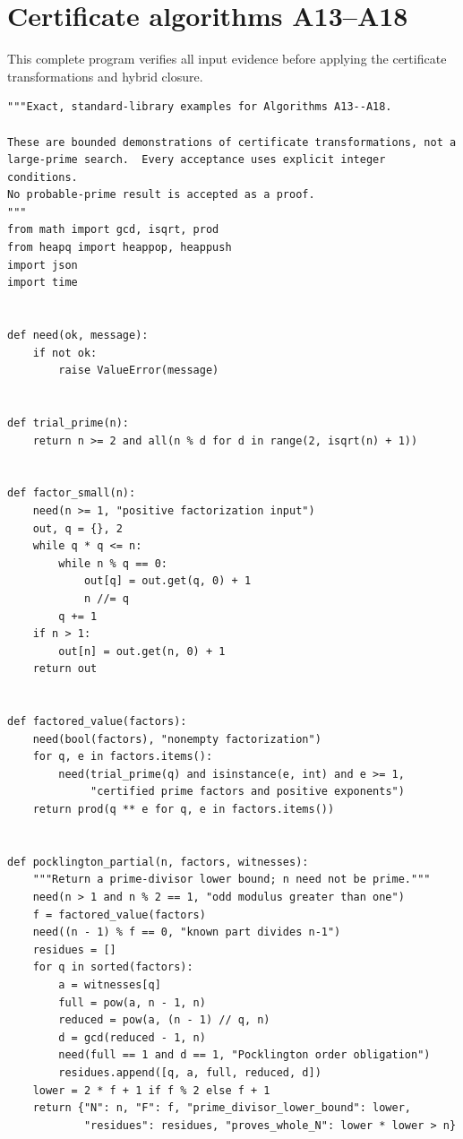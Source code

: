\documentclass[11pt,a4paper]{article}
\theoremstyle{definition}\newtheorem{definition}[theorem]{Definition}
\theoremstyle{remark}\newtheorem{remark}[theorem]{Remark}
\begin{document}
\section{Certificate algorithms A13--A18}
\label{app:certificates}

This complete program verifies all input evidence before applying the certificate transformations and hybrid closure.

\begin{lstlisting}[label=lst:certificates]
"""Exact, standard-library examples for Algorithms A13--A18.

These are bounded demonstrations of certificate transformations, not a
large-prime search.  Every acceptance uses explicit integer conditions.
No probable-prime result is accepted as a proof.
"""
from math import gcd, isqrt, prod
from heapq import heappop, heappush
import json
import time


def need(ok, message):
    if not ok:
        raise ValueError(message)


def trial_prime(n):
    return n >= 2 and all(n % d for d in range(2, isqrt(n) + 1))


def factor_small(n):
    need(n >= 1, "positive factorization input")
    out, q = {}, 2
    while q * q <= n:
        while n % q == 0:
            out[q] = out.get(q, 0) + 1
            n //= q
        q += 1
    if n > 1:
        out[n] = out.get(n, 0) + 1
    return out


def factored_value(factors):
    need(bool(factors), "nonempty factorization")
    for q, e in factors.items():
        need(trial_prime(q) and isinstance(e, int) and e >= 1,
             "certified prime factors and positive exponents")
    return prod(q ** e for q, e in factors.items())


def pocklington_partial(n, factors, witnesses):
    """Return a prime-divisor lower bound; n need not be prime."""
    need(n > 1 and n % 2 == 1, "odd modulus greater than one")
    f = factored_value(factors)
    need((n - 1) % f == 0, "known part divides n-1")
    residues = []
    for q in sorted(factors):
        a = witnesses[q]
        full = pow(a, n - 1, n)
        reduced = pow(a, (n - 1) // q, n)
        d = gcd(reduced - 1, n)
        need(full == 1 and d == 1, "Pocklington order obligation")
        residues.append([q, a, full, reduced, d])
    lower = 2 * f + 1 if f % 2 else f + 1
    return {"N": n, "F": f, "prime_divisor_lower_bound": lower,
            "residues": residues, "proves_whole_N": lower * lower > n}



\end{lstlisting}
\end{document}
